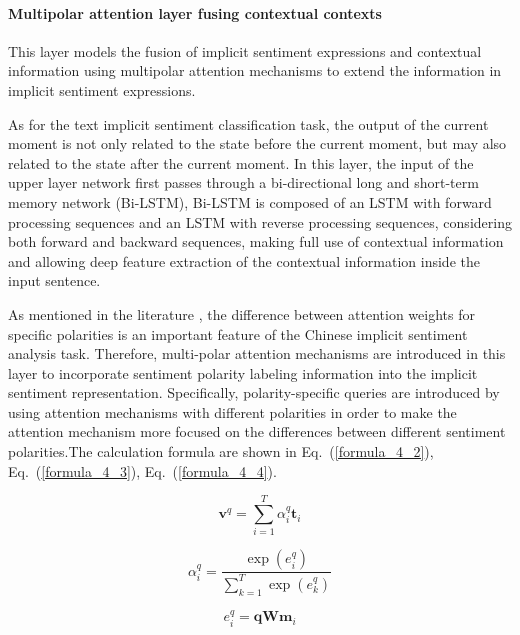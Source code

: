 \paragraph{Multipolar attention layer fusing contextual contexts}

This layer models the fusion of implicit sentiment expressions and contextual information using multipolar attention mechanisms to extend the information in implicit sentiment expressions.

As for the text implicit sentiment classification task, the output of the current moment is not only related to the state before the current moment, but may also related to the state after the current moment.
In this layer, the input of the upper layer network first passes through a bi-directional long and short-term memory network (Bi-LSTM), Bi-LSTM is composed of an LSTM with forward processing sequences and an LSTM with reverse processing sequences, considering both forward and backward sequences, making full use of contextual information and allowing deep feature extraction of the contextual information inside the input sentence.

As mentioned in the literature \cite{wei2020BiLSTM}, the difference between attention weights for specific polarities is an important feature of the Chinese implicit sentiment analysis task.
Therefore, multi-polar attention mechanisms are introduced in this layer to incorporate sentiment polarity labeling information into the implicit sentiment representation. Specifically, polarity-specific queries are introduced by using attention mechanisms with different polarities in order to make the attention mechanism more focused on the differences between different sentiment polarities.The calculation formula are shown in Eq.~(\ref{formula_4_2}), Eq.~(\ref{formula_4_3}), Eq.~(\ref{formula_4_4}).

\begin{equation}
    \boldsymbol{v}^q=\sum_{i=1}^T \alpha_i^q \boldsymbol{t}_i
    \label{formula_4_2}
\end{equation}

\begin{equation}
    \alpha_i^q=\frac{\exp \left(e_i^q\right)}{\sum_{k=1}^T \exp \left(e_k^q\right)}
    \label{formula_4_3}
\end{equation}


\begin{equation}
    e_i^q=\boldsymbol{q} \boldsymbol{W} \boldsymbol{m}_i
    \label{formula_4_4}
\end{equation}

